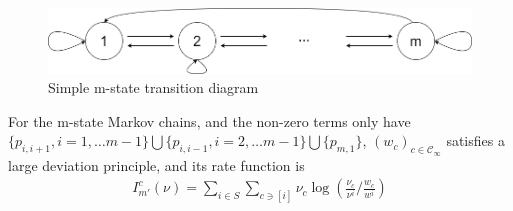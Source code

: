 \documentclass[11pt,en,cite=authoryear]{elegantpaper}
\begin{document}
\begin{figure}[h]
    \centering
    \includegraphics[scale=0.3]{n-state.png}
    \caption{Simple m-state transition diagram}
\end{figure}
\begin{theorem}
    For the m-state Markov chains, and the non-zero terms only have $\{p_{i, i+1}, i=1, \dots m-1\} \bigcup \{p_{i, i-1}, i=2, \dots m-1\} \bigcup \{p_{m,1}\}$, $(w_{c})_{c \in \mathcal{C}_{\infty}}$ satisfies a large deviation principle, and its rate function is
    \begin{align*}
        I_{m'}^{c}(\nu) = \sum_{i \in S} \sum_{c \ni [i]} \nu_c \log \left(\frac{\nu_c}{\nu^i} /\frac{w_c}{w^i}\right)
    \end{align*}
\end{theorem}
\end{document}
